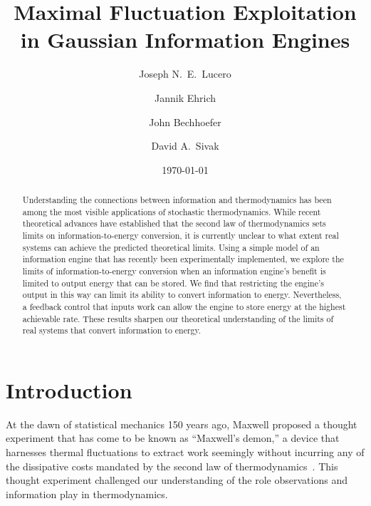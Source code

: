 \documentclass[%
reprint,
bibnotes, amsmath, amssymb, aps, pre,
 showkeys,
floatfix
]{revtex4-2}
\begin{document}
\title{Maximal Fluctuation Exploitation in Gaussian Information Engines}

\author{Joseph N.\ E.\ Lucero}
\author{Jannik Ehrich}
\author{John Bechhoefer}
\author{David A.\ Sivak}
%

\date{\today}

\begin{abstract}
Understanding the connections between information and thermodynamics has been among the most visible applications of stochastic thermodynamics.
While recent theoretical advances have established that the second law of thermodynamics sets limits on information-to-energy conversion, it is currently unclear to what extent real systems can achieve the predicted theoretical limits.
Using a simple model of an information engine that has recently been experimentally implemented, we explore the limits of information-to-energy conversion when an information engine's benefit is limited to output energy that can be stored.
We find that restricting the engine's output in this way can limit its ability to convert information to energy. Nevertheless, a feedback control that inputs work can allow the engine to store energy at the highest achievable rate.
These results sharpen our theoretical understanding of the limits of real systems that convert information to energy.
\end{abstract}


\maketitle

\section{Introduction}

At the dawn of statistical mechanics 150 years ago, Maxwell proposed a thought experiment that has come to be known as ``Maxwell's demon,'' a device that harnesses thermal fluctuations to extract work seemingly without incurring any of the dissipative costs mandated by the second law of thermodynamics~\cite{Maxwell1878}. 
This thought experiment challenged our understanding of the role observations and information play in thermodynamics.
\end{document}
